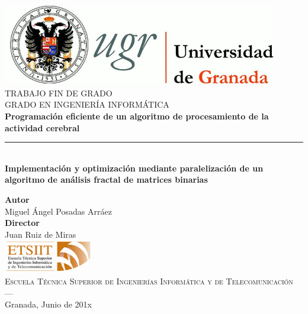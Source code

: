 \begin{titlepage}
\newlength{\centeroffset}
\setlength{\centeroffset}{-0.5\oddsidemargin}
\addtolength{\centeroffset}{0.5\evensidemargin}
\thispagestyle{empty}

\noindent\hspace*{\centeroffset}\begin{minipage}{\textwidth}

\centering
\includegraphics[width=0.9\textwidth]{logos/logo_ugr.jpg}\\[1.4cm]

\textsc{ \Large TRABAJO FIN DE GRADO\\[0.2cm]}
\textsc{ GRADO EN INGENIERÍA INFORMÁTICA}\\[1cm]

{\Huge\bfseries Programación eficiente de un algoritmo de procesamiento de la actividad cerebral \\}
\noindent\rule[-1ex]{\textwidth}{3pt}\\[3.5ex]
{\large\bfseries Implementación y optimización mediante paralelización de un algoritmo de análisis fractal de matrices binarias }
\end{minipage}

\vspace{1cm}
\noindent\hspace*{\centeroffset}
\begin{minipage}{\textwidth}
\centering

\textbf{Autor}\\ {Miguel Ángel Posadas Arráez}\\[2.5ex]
\textbf{Director}\\ Juan Ruiz de Miras\\[2cm]
\includegraphics[width=0.3\textwidth]{logos/etsiit_logo.png}\\[0.1cm]
\textsc{Escuela Técnica Superior de Ingenierías Informática y de Telecomunicación}\\
\textsc{---}\\
Granada, Junio de 201x
\end{minipage}
\end{titlepage}
